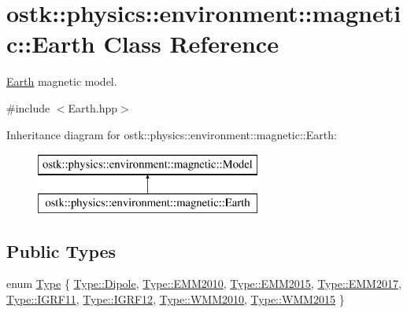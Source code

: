 \hypertarget{classostk_1_1physics_1_1environment_1_1magnetic_1_1_earth}{}\section{ostk\+:\+:physics\+:\+:environment\+:\+:magnetic\+:\+:Earth Class Reference}
\label{classostk_1_1physics_1_1environment_1_1magnetic_1_1_earth}


\hyperlink{classostk_1_1physics_1_1environment_1_1magnetic_1_1_earth}{Earth} magnetic model.  




{\ttfamily \#include $<$Earth.\+hpp$>$}

Inheritance diagram for ostk\+:\+:physics\+:\+:environment\+:\+:magnetic\+:\+:Earth\+:\begin{figure}[H]
\begin{center}
\leavevmode
\includegraphics[height=2.000000cm]{classostk_1_1physics_1_1environment_1_1magnetic_1_1_earth}
\end{center}
\end{figure}
\subsection*{Public Types}
\begin{DoxyCompactItemize}
\item 
enum \hyperlink{classostk_1_1physics_1_1environment_1_1magnetic_1_1_earth_a30a064d87b6fce338e76aebd3043b6b6}{Type} \{ \newline
\hyperlink{classostk_1_1physics_1_1environment_1_1magnetic_1_1_earth_a30a064d87b6fce338e76aebd3043b6b6a7627ce84eadbc3098e818fa89b368c2c}{Type\+::\+Dipole}, 
\hyperlink{classostk_1_1physics_1_1environment_1_1magnetic_1_1_earth_a30a064d87b6fce338e76aebd3043b6b6aed2fcd927feb1858e659c2278acc9b04}{Type\+::\+E\+M\+M2010}, 
\hyperlink{classostk_1_1physics_1_1environment_1_1magnetic_1_1_earth_a30a064d87b6fce338e76aebd3043b6b6abeb005aa2afa040561e58b462da8583d}{Type\+::\+E\+M\+M2015}, 
\hyperlink{classostk_1_1physics_1_1environment_1_1magnetic_1_1_earth_a30a064d87b6fce338e76aebd3043b6b6a19d30648df1be691437893aae34fcf62}{Type\+::\+E\+M\+M2017}, 
\newline
\hyperlink{classostk_1_1physics_1_1environment_1_1magnetic_1_1_earth_a30a064d87b6fce338e76aebd3043b6b6aa2ad57512dc0d08c7e8937152ebec747}{Type\+::\+I\+G\+R\+F11}, 
\hyperlink{classostk_1_1physics_1_1environment_1_1magnetic_1_1_earth_a30a064d87b6fce338e76aebd3043b6b6a9a61c68f57fc5ed7927cfcec00291c11}{Type\+::\+I\+G\+R\+F12}, 
\hyperlink{classostk_1_1physics_1_1environment_1_1magnetic_1_1_earth_a30a064d87b6fce338e76aebd3043b6b6acf25da7a5a5ba3ab08e4c26071ed0b20}{Type\+::\+W\+M\+M2010}, 
\hyperlink{classostk_1_1physics_1_1environment_1_1magnetic_1_1_earth_a30a064d87b6fce338e76aebd3043b6b6a164a99cca8995f690571ed8f964e6166}{Type\+::\+W\+M\+M2015}
 \}
\end{DoxyCompactItemize}
